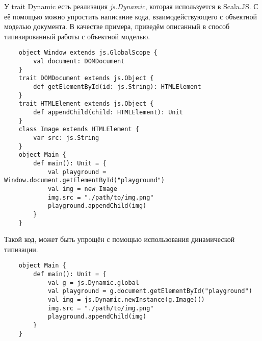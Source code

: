 

У trait Dynamic есть реализация \textit{js.Dynamic}, которая используется в Scala.JS. С её помощью можно упростить написание кода, взаимодействующего с объектной моделью документа. В качестве примера, приведём описанный в \cite{art:doeraene2013scala} способ типизированный работы с объектной моделью.

\begin{verbatim}
    object Window extends js.GlobalScope {
        val document: DOMDocument
    }
    trait DOMDocument extends js.Object {
        def getElementById(id: js.String): HTMLElement
    }
    trait HTMLElement extends js.Object {
        def appendChild(child: HTMLElement): Unit
    }
    class Image extends HTMLElement {
        var src: js.String
    }
    object Main {
        def main(): Unit = {
            val playground = Window.document.getElementById("playground")
            val img = new Image
            img.src = "./path/to/img.png"
            playground.appendChild(img)
        }
    }
\end{verbatim}

Такой код, может быть упрощён с помощью использования динамической типизации.

\begin{verbatim}
    object Main {
        def main(): Unit = {
            val g = js.Dynamic.global
            val playground = g.document.getElementById("playground")
            val img = js.Dynamic.newInstance(g.Image)()
            img.src = "./path/to/img.png"
            playground.appendChild(img)
        }
    }
\end{verbatim}

